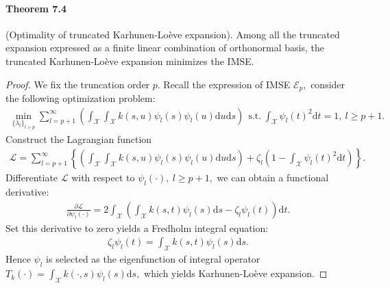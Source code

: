 \documentclass{article}
\begin{document}
\paragraph{Theorem 7.4} (Optimality of truncated Karhunen-Loève expansion). Among all the truncated expansion expressed as a finite linear combination of orthonormal basis, the truncated Karhunen-Loève expansion minimizes the IMSE.
\begin{proof}
We fix the truncation order $p$. Recall the expression of IMSE $\mathcal{E}_p,$ consider the following optimization problem:
\begin{align*}
	\min_{\lbrace \lambda_l\rbrace_{l>p}} \sum_{l=p+1}^\infty\left(\int_\mathcal{X}\int_\mathcal{X}k(s,u)\psi_l(s)\psi_l(u)\mathrm{d}u\mathrm{d}s\right)\ \ \mathrm{s.t.}\ \int_\mathcal{X}\psi_l(t)^2\mathrm{d}t = 1,\ l\geq p+1.\tag{7.32}
\end{align*}
Construct the Lagrangian function
\begin{align*}
	\mathcal{L} = \sum_{l=p+1}^\infty\left\lbrace\left(\int_\mathcal{X}\int_\mathcal{X}k(s,u)\psi_l(s)\psi_l(u)\mathrm{d}u\mathrm{d}s\right) + \zeta_l\left(1 - \int_\mathcal{X}\psi_l(t)^2\mathrm{d}t\right)\right\rbrace.\tag{7.33}
\end{align*}
Differentiate $\mathcal{L}$ with respect to $\psi_l(\cdot),\ l\geq p+1,$ we can obtain a functional derivative:
\begin{align*}
	\frac{\partial\mathcal{L}}{\partial\psi_l(\cdot)} = 2\int_\mathcal{X}\left(\int_\mathcal{X}k(s,t)\psi_l(s)\mathrm{d}s - \zeta_l\psi_l(t)\right)\mathrm{d}t.\tag{7.34}
\end{align*}
Set this derivative to zero yields a Fredholm integral equation:
\begin{align*}
	\zeta_l\psi_l(t) = \int_\mathcal{X}k(s,t)\psi_l(s)\mathrm{d}s.\tag{7.35}
\end{align*} 
Hence $\psi_l$ is selected as the eigenfunction of integral operator $T_k(\cdot) = \int_\mathcal{X}k(\cdot,s)\psi_l(s)\mathrm{d}s,$ which yields Karhunen-Loève expansion.
\end{proof} 
\end{document}
